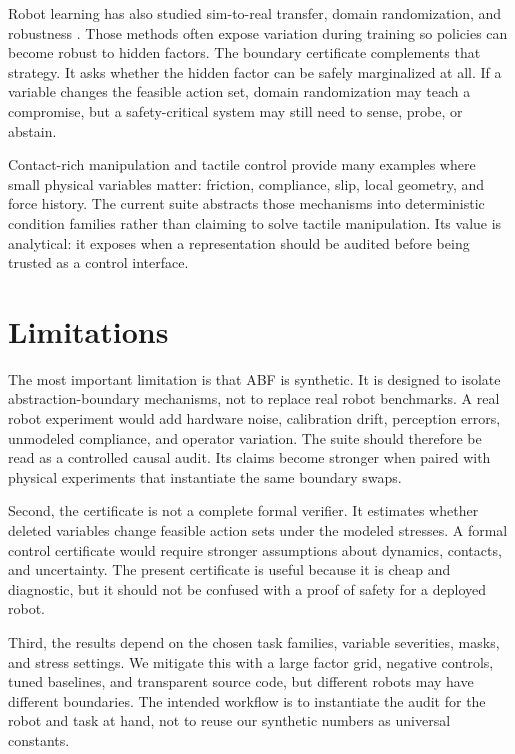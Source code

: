 \documentclass{article}
\newcommand{\suite}{ABF}
\begin{document}
Robot learning has also studied sim-to-real transfer, domain randomization, and
robustness \citep{tobin2017domain, rusu2017simreal}. Those methods often expose
variation during training so policies can become robust to hidden factors. The
boundary certificate complements that strategy. It asks whether the hidden factor
can be safely marginalized at all. If a variable changes the feasible action set,
domain randomization may teach a compromise, but a safety-critical system may
still need to sense, probe, or abstain.

Contact-rich manipulation and tactile control provide many examples where small
physical variables matter: friction, compliance, slip, local geometry, and force
history. The current suite abstracts those mechanisms into deterministic
condition families rather than claiming to solve tactile manipulation. Its value
is analytical: it exposes when a representation should be audited before being
trusted as a control interface.

\section{Limitations}

The most important limitation is that \suite{} is synthetic. It is designed to
isolate abstraction-boundary mechanisms, not to replace real robot benchmarks.
A real robot experiment would add hardware noise, calibration drift, perception
errors, unmodeled compliance, and operator variation. The suite should therefore
be read as a controlled causal audit. Its claims become stronger when paired with
physical experiments that instantiate the same boundary swaps.

Second, the certificate is not a complete formal verifier. It estimates whether
deleted variables change feasible action sets under the modeled stresses. A
formal control certificate would require stronger assumptions about dynamics,
contacts, and uncertainty. The present certificate is useful because it is cheap
and diagnostic, but it should not be confused with a proof of safety for a
deployed robot.

Third, the results depend on the chosen task families, variable severities,
masks, and stress settings. We mitigate this with a large factor grid, negative
controls, tuned baselines, and transparent source code, but different robots may
have different boundaries. The intended workflow is to instantiate the audit for
the robot and task at hand, not to reuse our synthetic numbers as universal
constants.
\end{document}
